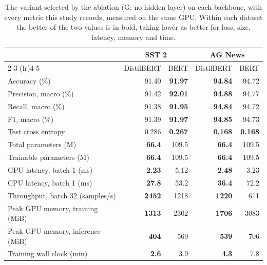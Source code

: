 \begin{table}[t]
\centering
\scriptsize
\caption{The variant selected by the ablation (G: no hidden layer) on each backbone, with every metric this study records, measured on the same GPU. Within each dataset the better of the two values is in bold, taking lower as better for loss, size, latency, memory and time.}
\label{tab:best}
\begin{tabular}{lrrrr}
\toprule
 & \multicolumn{2}{c}{SST 2} & \multicolumn{2}{c}{AG News} \\
\cmidrule(lr){2-3} \cmidrule(lr){4-5}
 & DistilBERT & BERT & DistilBERT & BERT \\
\midrule
Accuracy (\%) & 91.40 & \textbf{91.97} & \textbf{94.84} & 94.72 \\
Precision, macro (\%) & 91.42 & \textbf{92.01} & \textbf{94.88} & 94.77 \\
Recall, macro (\%) & 91.38 & \textbf{91.95} & \textbf{94.84} & 94.72 \\
F1, macro (\%) & 91.39 & \textbf{91.97} & \textbf{94.85} & 94.73 \\
Test cross entropy & 0.286 & \textbf{0.267} & \textbf{0.168} & \textbf{0.168} \\
Total parameters (M) & \textbf{66.4} & 109.5 & \textbf{66.4} & 109.5 \\
Trainable parameters (M) & \textbf{66.4} & 109.5 & \textbf{66.4} & 109.5 \\
GPU latency, batch 1 (ms) & \textbf{2.23} & 5.12 & \textbf{2.48} & 3.23 \\
CPU latency, batch 1 (ms) & \textbf{27.8} & 53.2 & \textbf{36.4} & 72.2 \\
Throughput, batch 32 (samples/s) & \textbf{2452} & 1218 & \textbf{1220} & 611 \\
Peak GPU memory, training (MiB) & \textbf{1313} & 2302 & \textbf{1706} & 3083 \\
Peak GPU memory, inference (MiB) & \textbf{404} & 569 & \textbf{539} & 706 \\
Training wall clock (min) & \textbf{2.6} & 3.9 & \textbf{4.3} & 7.8 \\
\bottomrule
\end{tabular}
\end{table}
